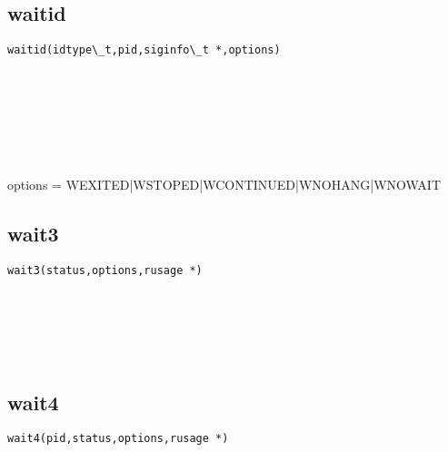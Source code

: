 \documentclass[10pt,a4paper]{article}
\begin{document}
\subsection{waitid}
\begin{spacing}{2.0}
\lstset{language=C,numbers=none}
\begin{lstlisting}
waitid(idtype\_t,pid,siginfo\_t *,options)
\end{lstlisting}
{\large\color[rgb]{0.2,0.4,0.6}{idtype\_t:}} \\
{\large\color[rgb]{0.2,0.4,0.6}{pid:}} \\
{\large\color[rgb]{0.2,0.4,0.6}{*:}} \\
{\large\color[rgb]{0.2,0.4,0.6}{options:}}
\paragraph{ \ \ }options = WEXITED|WSTOPED|WCONTINUED|WNOHANG|WNOWAIT
\end{spacing}

\subsection{wait3}
\begin{spacing}{2.0}
\lstset{language=C,numbers=none}
\begin{lstlisting}
wait3(status,options,rusage *)
\end{lstlisting}
{\large\color[rgb]{0.2,0.4,0.6}{status:}} \\
{\large\color[rgb]{0.2,0.4,0.6}{options:}} \\
{\large\color[rgb]{0.2,0.4,0.6}{*:}}
\paragraph{ \ \ }
\end{spacing}

\subsection{wait4}
\begin{spacing}{2.0}
\lstset{language=C,numbers=none}
\begin{lstlisting}
wait4(pid,status,options,rusage *)
\end{lstlisting}
{\large\color[rgb]{0.2,0.4,0.6}{pid:}} \\
{\large\color[rgb]{0.2,0.4,0.6}{status:}} \\
{\large\color[rgb]{0.2,0.4,0.6}{options:}} \\
{\large\color[rgb]{0.2,0.4,0.6}{*:}}
\paragraph{ \ \ }
\end{spacing}
\end{document}
